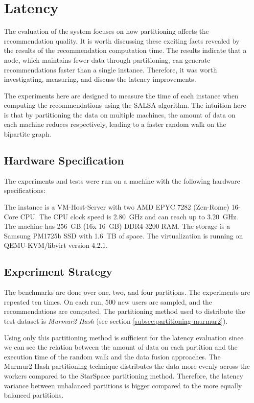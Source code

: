 \section{Latency}
\label{sec:eval-latency}
The evaluation of the system focuses on how partitioning affects the recommendation quality. It is worth discussing these exciting facts revealed by the results of the recommendation computation time. The results indicate that a node, which maintains fewer data through partitioning, can generate recommendations faster than a single instance. Therefore, it was worth investigating, measuring, and discuss the latency improvements.


The experiments here are designed to measure the time of each instance when computing the recommendations using the SALSA algorithm. The intuition here is that by partitioning the data on multiple machines, the amount of data on each machine reduces respectively, leading to a faster random walk on the bipartite graph. 

\subsection{Hardware Specification}
\label{subsec:hardware-spec}
The experiments and tests were run on a machine with the following hardware specifications:

The instance is a VM-Host-Server with two AMD EPYC 7282 (Zen-Rome) 16-Core CPU. The CPU clock speed is 2.80~GHz and can reach up to 3.20~GHz. The machine has 256~GB (16x 16~GB) DDR4-3200 RAM. The storage is a Samsung PM1725b SSD with 1.6~TB of space. The virtualization is running on QEMU-KVM/libvirt version 4.2.1.


\subsection{Experiment Strategy}
\label{subsec:latency-experiment-strategy}
The benchmarks are done over one, two, and four partitions. The experiments are repeated ten times. On each run, 500 new users are sampled, and the recommendations are computed. The partitioning method used to distribute the test dataset is \emph{Murmur2 Hash} (see section \ref{subsec:partitioning-murmur2}). 


Using only this partitioning method is sufficient for the latency evaluation since we can see the relation between the amount of data on each partition and the execution time of the random walk and the data fusion approaches. The Murmur2 Hash partitioning technique distributes the data more evenly across the workers compared to the StarSpace partitioning method. Therefore, the latency variance between unbalanced partitions is bigger compared to the more equally balanced partitions.

